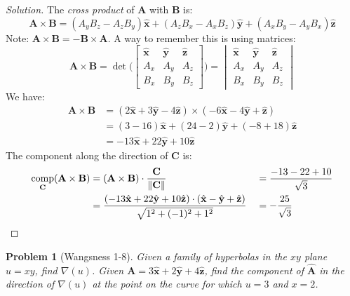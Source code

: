 \documentclass{article}
\theoremstyle{mystyle}
\newtheorem{problem}{Problem}[section]
\DeclareMathOperator{\comp}{comp}
\begin{document}
\begin{proof}[Solution]
The \textit{cross product} of $\mathbf{A}$ with $\mathbf{B}$ is:
\begin{equation*}
    \mathbf{A}\times\mathbf{B}=(A_{y}B_{z}-A_{z}B_{y})\hat{\mathbf{x}}+(A_{z}B_{x}-A_{x}B_{z})\hat{\mathbf{y}}+(A_{x}B_{y}-A_{y}B_{x})\hat{\mathbf{z}}
\end{equation*}
Note: $\mathbf{A}\times\mathbf{B} = -\mathbf{B}\times\mathbf{A}$. A way to remember this is using matrices:
\begin{equation*}
    \mathbf{A}\times\mathbf{B}=\det\Bigg(\begin{bmatrix}\hat{\mathbf{x}}&\hat{\mathbf{y}}&\hat{\mathbf{z}}\\A_{x}&A_{y}&A_{z}\\B_{x}&B_{y}&B_{z}\end{bmatrix}\Bigg)=\begin{vmatrix}\hat{\mathbf{x}}&\hat{\mathbf{y}}&\hat{\mathbf{z}}\\A_{x}&A_{y}&A_{z}\\B_{x}&B_{y}&B_{z}\end{vmatrix}
\end{equation*}
We have:
\begin{align*}
    \mathbf{A}\times\mathbf{B} &=(2\hat{\mathbf{x}}+3\hat{\mathbf{y}}-4\hat{\mathbf{z}})\times(-6\hat{\mathbf{x}}-4\hat{\mathbf{y}}+\hat{\mathbf{z}})\\
    &= (3-16)\hat{\mathbf{x}}+(24-2)\hat{\mathbf{y}}+(-8+18)\hat{\mathbf{z}}\\
    &= -13\hat{\mathbf{x}}+22\hat{\mathbf{y}}+10\hat{\mathbf{z}}
\end{align*}
The component along the direction of $\mathbf{C}$ is:
\begin{align*}
    \comp_{\mathbf{C}}(\mathbf{A}\times\mathbf{B})&=(\mathbf{A}\times\mathbf{B})\cdot\frac{\mathbf{C}}{\norm{\mathbf{C}}}& &=\frac{-13-22+10}{\sqrt{3}}\\
    &=\frac{(-13\hat{\mathbf{x}}+22\hat{\mathbf{y}}+10\hat{\mathbf{z}})\cdot(\hat{\mathbf{x}}-\hat{\mathbf{y}}+\hat{\mathbf{z}})}{\sqrt{1^2+(-1)^2+1^2}}& &=-\frac{25}{\sqrt{3}}
\end{align*}
\end{proof}
\begin{problem}[Wangsness 1-8]
Given a family of hyperbolas in the $xy$ plane $u=xy$, find $\nabla(u)$. Given $\mathbf{A}=3\hat{\mathbf{x}}+2\hat{\mathbf{y}}+4\hat{\mathbf{z}}$, find the component of $\hat{\mathbf{A}}$ in the direction of $\nabla(u)$ at the point on the curve for which $u=3$ and $x=2$.
\end{problem}
\end{document}
